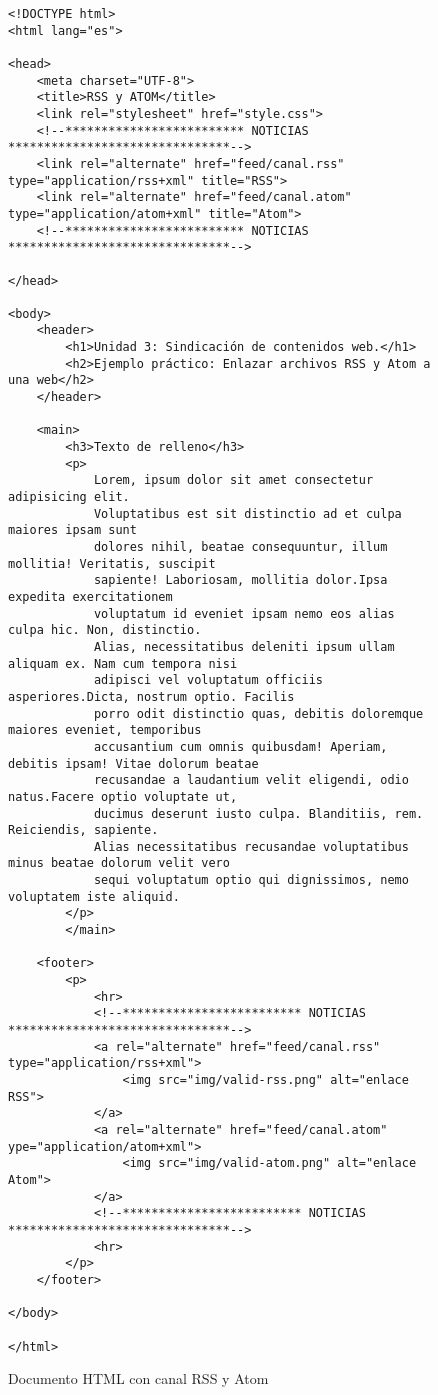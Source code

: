 \begin{figure}[H]
    \begin{tcolorbox}[sharp corners, colback=yellow!30, colframe=white!20]
        \scriptsize
        \begin{verbatim}
<!DOCTYPE html>
<html lang="es">

<head>
    <meta charset="UTF-8">
    <title>RSS y ATOM</title>
    <link rel="stylesheet" href="style.css">
    <!--************************* NOTICIAS *******************************-->
    <link rel="alternate" href="feed/canal.rss" type="application/rss+xml" title="RSS">
    <link rel="alternate" href="feed/canal.atom" type="application/atom+xml" title="Atom">
    <!--************************* NOTICIAS *******************************-->

</head>

<body>
    <header>
        <h1>Unidad 3: Sindicación de contenidos web.</h1>
        <h2>Ejemplo práctico: Enlazar archivos RSS y Atom a una web</h2>
    </header>

    <main>
        <h3>Texto de relleno</h3>
        <p>
            Lorem, ipsum dolor sit amet consectetur adipisicing elit.
            Voluptatibus est sit distinctio ad et culpa maiores ipsam sunt
            dolores nihil, beatae consequuntur, illum mollitia! Veritatis, suscipit
            sapiente! Laboriosam, mollitia dolor.Ipsa expedita exercitationem
            voluptatum id eveniet ipsam nemo eos alias culpa hic. Non, distinctio.
            Alias, necessitatibus deleniti ipsum ullam aliquam ex. Nam cum tempora nisi
            adipisci vel voluptatum officiis asperiores.Dicta, nostrum optio. Facilis
            porro odit distinctio quas, debitis doloremque maiores eveniet, temporibus
            accusantium cum omnis quibusdam! Aperiam, debitis ipsam! Vitae dolorum beatae
            recusandae a laudantium velit eligendi, odio natus.Facere optio voluptate ut,
            ducimus deserunt iusto culpa. Blanditiis, rem. Reiciendis, sapiente.
            Alias necessitatibus recusandae voluptatibus minus beatae dolorum velit vero
            sequi voluptatum optio qui dignissimos, nemo voluptatem iste aliquid.
        </p>
        </main>

    <footer>
        <p>
            <hr>
            <!--************************* NOTICIAS *******************************-->
            <a rel="alternate" href="feed/canal.rss" type="application/rss+xml">
                <img src="img/valid-rss.png" alt="enlace RSS">
            </a>
            <a rel="alternate" href="feed/canal.atom" ype="application/atom+xml">
                <img src="img/valid-atom.png" alt="enlace Atom">
            </a>
            <!--************************* NOTICIAS *******************************-->
            <hr>
        </p>
    </footer>

</body>

</html>
        \end{verbatim}
    \end{tcolorbox}
    \caption{Documento HTML con canal RSS y Atom}
\end{figure}

